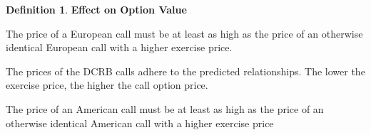 \documentclass{book}
\theoremstyle{definition}
\newtheorem{definition}{Definition}[section]
\theoremstyle{remark}
\begin{document}
\begin{definition}{\textbf{Effect on Option Value}}
        \begin{tcolorbox}[colback=blue!5!white,colframe=blue!75!black, title=Sticky Note]
            The price of a European call must be at least as high as the price of an otherwise identical European call with a higher exercise price.
        \end{tcolorbox}  
                
                The prices of the DCRB calls adhere to the predicted relationships. The lower the exercise price, the higher the call option price.
            
        \begin{tcolorbox}[colback=blue!5!white,colframe=blue!75!black, title=Sticky Note]
            The price of an American call must be at least as high as the price of an otherwise identical American call with a higher exercise price 
        \end{tcolorbox}              
            \end{definition}
            
\end{document}

